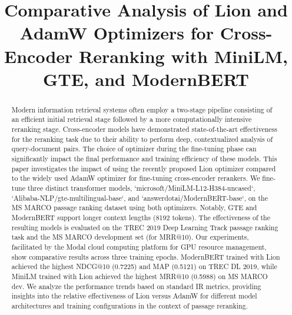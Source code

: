\documentclass[conference]{IEEEtran}
\begin{document}
\title{Comparative Analysis of Lion and AdamW Optimizers for Cross-Encoder Reranking with MiniLM, GTE, and ModernBERT}

\author{
\and %
}

\maketitle

\begin{abstract}
Modern information retrieval systems often employ a two-stage pipeline consisting of an efficient initial retrieval stage followed by a more computationally intensive reranking stage. Cross-encoder models have demonstrated state-of-the-art effectiveness for the reranking task due to their ability to perform deep, contextualized analysis of query-document pairs. The choice of optimizer during the fine-tuning phase can significantly impact the final performance and training efficiency of these models. This paper investigates the impact of using the recently proposed Lion optimizer compared to the widely used AdamW optimizer for fine-tuning cross-encoder rerankers. We fine-tune three distinct transformer models, `microsoft/MiniLM-L12-H384-uncased`, `Alibaba-NLP/gte-multilingual-base`, and `answerdotai/ModernBERT-base`, on the MS MARCO passage ranking dataset using both optimizers. Notably, GTE and ModernBERT support longer context lengths (8192 tokens). The effectiveness of the resulting models is evaluated on the TREC 2019 Deep Learning Track passage ranking task and the MS MARCO development set (for MRR@10). Our experiments, facilitated by the Modal cloud computing platform for GPU resource management, show comparative results across three training epochs. ModernBERT trained with Lion achieved the highest NDCG@10 (0.7225) and MAP (0.5121) on TREC DL 2019, while MiniLM trained with Lion achieved the highest MRR@10 (0.5988) on MS MARCO dev. We analyze the performance trends based on standard IR metrics, providing insights into the relative effectiveness of Lion versus AdamW for different model architectures and training configurations in the context of passage reranking.
\end{abstract}
\end{document}
